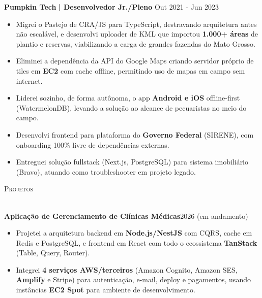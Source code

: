 \documentclass[a4paper]{article}
\newcommand{\lineunder}{
    \vspace*{-8pt} \\
    \hspace*{-18pt} \hrulefill \\
}
\newcommand{\header}[1]{
    {\hspace*{-18pt}\vspace*{6pt} \textsc{#1}}
    \vspace*{-6pt} \lineunder
}
\begin{document}
    \textbf{Pumpkin Tech}\textbf{ | Desenvolvedor Jr./Pleno} \hfill  Out 2021 - Jun 2023\\
    \vspace{-3mm}
    \begin{itemize} \itemsep -3pt
        \item Migrei o Pastejo de CRA/JS para TypeScript, destravando arquitetura antes n\~ao escal\'avel, e desenvolvi uploader de KML que importou \textbf{1.000+ \'areas} de plantio e reservas, viabilizando a carga de grandes fazendas do Mato Grosso.
        \item Eliminei a depend\^encia da API do Google Maps criando servidor pr\'oprio de tiles em \textbf{EC2} com cache offline, permitindo uso de mapas em campo sem internet.
        \item Liderei sozinho, de forma aut\^onoma, o app \textbf{Android e iOS} offline-first (WatermelonDB), levando a solu\c{c}\~ao ao alcance de pecuaristas no meio do campo.
        \item Desenvolvi frontend para plataforma do \textbf{Governo Federal} (SIRENE), com onboarding 100\% livre de depend\^encias externas.
        \item Entreguei solu\c{c}\~ao fullstack (Next.js, PostgreSQL) para sistema imobili\'ario (Bravo), atuando como troubleshooter em projeto legado.
    \end{itemize}

    \header{Projetos}
    \vspace{2mm}

    \textbf{Aplica\c{c}\~ao de Gerenciamento de Cl\'inicas M\'edicas}\hfill  2026 (em andamento)\\
    \vspace{-3mm}
    \begin{itemize} \itemsep -3pt
        \item Projetei a arquitetura backend em \textbf{Node.js/NestJS} com CQRS, cache em Redis e PostgreSQL, e frontend em React com todo o ecossistema \textbf{TanStack} (Table, Query, Router).
        \item Integrei \textbf{4 servi\c{c}os AWS/terceiros} (Amazon Cognito, Amazon SES, \textbf{Amplify} e Stripe) para autentica\c{c}\~ao, e-mail, deploy e pagamentos, usando inst\^ancias \textbf{EC2 Spot} para ambiente de desenvolvimento.
    \end{itemize}
\end{document}
